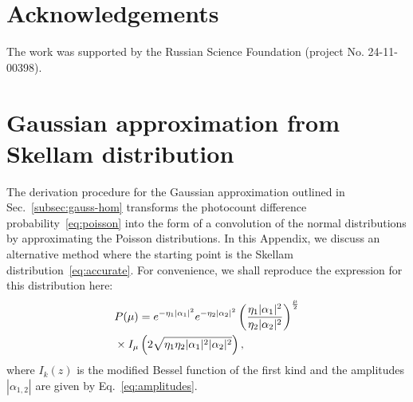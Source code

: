 \documentclass[%
reprint,
superscriptaddress,
 amsmath,amssymb,amsfonts,
 aps,
 pra,
 longbibliography
]{revtex4-2}
\begin{document}




\section*{Acknowledgements}
The work was supported by the Russian Science Foundation (project No. 24-11-00398).

\appendix

\section{Gaussian approximation from Skellam distribution}
\label{sec:appendix}



The derivation procedure for the Gaussian approximation
outlined in Sec.~\ref{subsec:gauss-hom}
transforms
the photocount difference probability~\eqref{eq:poisson}
into the form of a convolution of the normal distributions
by approximating the Poisson distributions.
In this Appendix,
we discuss an alternative method
where the starting point is the Skellam distribution~\eqref{eq:accurate}.
For convenience, we shall reproduce the expression for
this distribution here:
\begin{align}
  &
\label{eq:Skellam}   
  P(\mu)=e^{-\eta_1|\alpha_1|^2}e^{-\eta_2|\alpha_2|^2}
  \left(\frac{\eta_1|\alpha_1|^2}{\eta_2|\alpha_2|^2}\right)^{\frac{\mu}{2}}
  \notag
  \\
  &
  \times
I_{\mu}\left(2\sqrt{\eta_1\eta_2|\alpha_1|^2|\alpha_2|^2}\right),
\end{align}
where $I_k(z)$ is the modified Bessel function of the first kind
and the amplitudes $|\alpha_{1,2}|$ are given by Eq.~\eqref{eq:amplitudes}.
\end{document}

